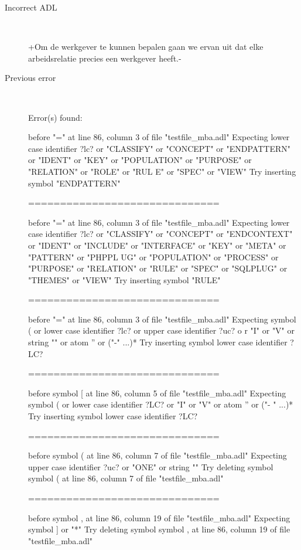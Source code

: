 \begin{description}
  \item[Incorrect ADL]~\\
\begin{adl}
{+Om de werkgever te kunnen bepalen gaan we ervan uit dat elke arbeidsrelatie precies een werkgever heeft.-}\end{adl}
  \item[Previous error]~\\
\begin{haskell}
Error(s) found:

before "=" at line 86, column 3 of file "testfile_mba.adl"
Expecting lower case identifier ?lc? or "CLASSIFY" or "CONCEPT" or "ENDPATTERN"
or "IDENT" or "KEY" or "POPULATION" or "PURPOSE" or "RELATION" or "ROLE" or "RUL
E" or "SPEC" or "VIEW"
Try inserting symbol "ENDPATTERN"

==============================

before "=" at line 86, column 3 of file "testfile_mba.adl"
Expecting lower case identifier ?lc? or "CLASSIFY" or "CONCEPT" or "ENDCONTEXT"
or "IDENT" or "INCLUDE" or "INTERFACE" or "KEY" or "META" or "PATTERN" or "PHPPL
UG" or "POPULATION" or "PROCESS" or "PURPOSE" or "RELATION" or "RULE" or "SPEC"
or "SQLPLUG" or "THEMES" or "VIEW"
Try inserting symbol "RULE"

==============================

before "=" at line 86, column 3 of file "testfile_mba.adl"
Expecting symbol ( or lower case identifier ?lc? or upper case identifier ?uc? o
r "I" or "V" or string "" or atom '' or ("-" ...)*
Try inserting symbol lower case identifier ?LC?

==============================

before symbol [ at line 86, column 5 of file "testfile_mba.adl"
Expecting symbol ( or lower case identifier ?LC? or "I" or "V" or atom '' or ("-
" ...)*
Try inserting symbol lower case identifier ?LC?

==============================

before symbol ( at line 86, column 7 of file "testfile_mba.adl"
Expecting upper case identifier ?uc? or "ONE" or string ""
Try deleting symbol symbol ( at line 86, column 7 of file "testfile_mba.adl"

==============================

before symbol , at line 86, column 19 of file "testfile_mba.adl"
Expecting symbol ] or "*"
Try deleting symbol symbol , at line 86, column 19 of file "testfile_mba.adl"


\end{haskell}
\end{description}
